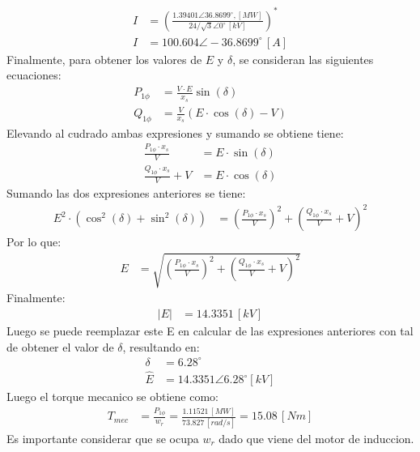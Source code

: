 \documentclass[
  11pt,
  letterpaper,
   addpoints,
   answers
  ]{exam}
\begin{document}
\begin{questions}
\begin{solution}
\begin{align}
        I &= \left( \frac{1.39401 \angle 36.8699^\circ, [MW]}{24/ \sqrt{3} \angle 0^\circ \, [kV]} \right)^* \\
        I &= 100.604 \angle -36.8699^\circ \, [A]
    \end{align}
     Finalmente, para obtener los valores de \(E\) y \(\delta\), se consideran las siguientes ecuaciones:
    \begin{align}
        P_{1\phi} &= \frac{V \cdot E}{x_s} \sin(\delta) \\
        Q_{1\phi} &= \frac{V}{x_s} \left( E \cdot \cos(\delta) - V \right)
    \end{align}
    Elevando al cudrado ambas expresiones y sumando se obtiene tiene:
    \begin{align}
        \frac{P_{1\phi} \cdot x_s}{V} &= E \cdot \sin(\delta) \\
        \frac{Q_{1\phi} \cdot x_s}{V} + V &= E \cdot \cos(\delta)
    \end{align}
    Sumando las dos expresiones anteriores se tiene:
    \begin{align}
        E^2 \cdot \left( \cos^2(\delta) + \sin^2(\delta) \right) &= \left( \frac{P_{1\phi} \cdot x_s}{V} \right)^2 + \left( \frac{Q_{1\phi} \cdot x_s}{V} + V \right)^2
    \end{align}
    Por lo que:
    \begin{align}
        E &= \sqrt{\left( \frac{P_{1\phi} \cdot x_s}{V} \right)^2 + \left( \frac{Q_{1\phi} \cdot x_s}{V} + V \right)^2}
    \end{align}
     Finalmente:
    \begin{align}
        |E| &= 14.3351\, [kV]
    \end{align}
    Luego se puede reemplazar este E en calcular de las expresiones anteriores con tal de obtener el valor de \( \delta \), resultando en:
    \begin{align}
        \delta &= 6.28^\circ \\
        \hat{E} &= 14.3351 \angle 6.28^\circ [kV]
    \end{align}
    Luego el torque mecanico se obtiene como:
    \begin{align}
        T_{mec} &= \frac{P_{1\phi}}{w_r} = \frac{1.11521 \, [MW]}{73.827 \, [rad/s]} = 15.08 \, [Nm]
    \end{align}
    Es importante considerar que se ocupa $w_{r}$ dado que viene del motor de induccion.

\end{solution}
\end{questions}
\end{document}
